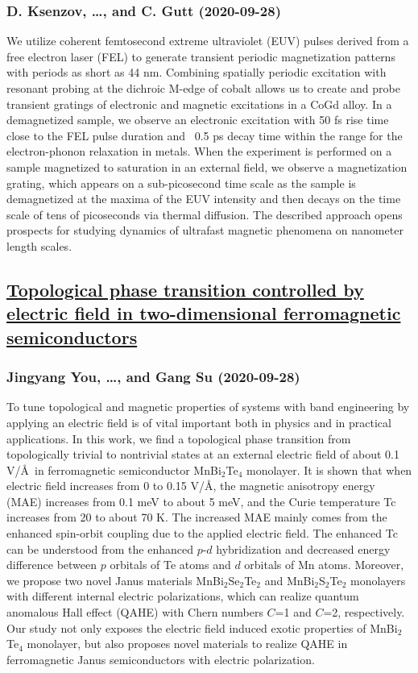 \subsubsection*{D. Ksenzov, \dots, and C. Gutt (2020-09-28)}
We utilize coherent femtosecond extreme ultraviolet (EUV) pulses derived from
a free electron laser (FEL) to generate transient periodic magnetization
patterns with periods as short as 44 nm. Combining spatially periodic
excitation with resonant probing at the dichroic M-edge of cobalt allows us to
create and probe transient gratings of electronic and magnetic excitations in a
CoGd alloy. In a demagnetized sample, we observe an electronic excitation with
50 fs rise time close to the FEL pulse duration and ~0.5 ps decay time within
the range for the electron-phonon relaxation in metals. When the experiment is
performed on a sample magnetized to saturation in an external field, we observe
a magnetization grating, which appears on a sub-picosecond time scale as the
sample is demagnetized at the maxima of the EUV intensity and then decays on
the time scale of tens of picoseconds via thermal diffusion. The described
approach opens prospects for studying dynamics of ultrafast magnetic phenomena
on nanometer length scales.

\subsection*{\href{http://arxiv.org/abs/2009.13328v1}{Topological phase transition controlled by electric field in  two-dimensional ferromagnetic semiconductors}}
\subsubsection*{Jingyang You, \dots, and Gang Su (2020-09-28)}
To tune topological and magnetic properties of systems with band engineering
by applying an electric field is of vital important both in physics and in
practical applications. In this work, we find a topological phase transition
from topologically trivial to nontrivial states at an external electric field
of about 0.1 V/\AA\ in ferromagnetic semiconductor MnBi$_2$Te$_4$ monolayer. It
is shown that when electric field increases from 0 to 0.15 V/\AA, the magnetic
anisotropy energy (MAE) increases from 0.1 meV to about 5 meV, and the Curie
temperature Tc increases from 20 to about 70 K. The increased MAE mainly comes
from the enhanced spin-orbit coupling due to the applied electric field. The
enhanced Tc can be understood from the enhanced $p$-$d$ hybridization and
decreased energy difference between $p$ orbitals of Te atoms and $d$ orbitals
of Mn atoms. Moreover, we propose two novel Janus materials
MnBi$_2$Se$_2$Te$_2$ and MnBi$_2$S$_2$Te$_2$ monolayers with different internal
electric polarizations, which can realize quantum anomalous Hall effect (QAHE)
with Chern numbers $C$=1 and $C$=2, respectively. Our study not only exposes
the electric field induced exotic properties of MnBi$_2$Te$_4$ monolayer, but
also proposes novel materials to realize QAHE in ferromagnetic Janus
semiconductors with electric polarization.

